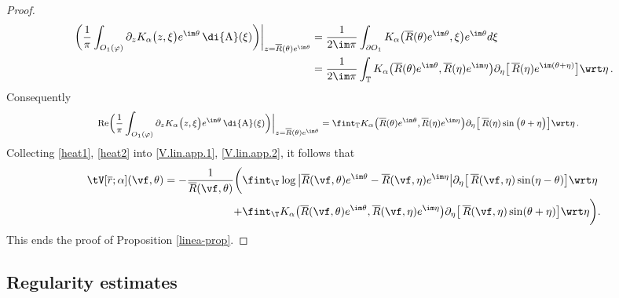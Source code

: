 \documentclass[a4paper,reqno,10pt]{article}
\newcommand{\pa}{\partial}
\newcommand{\wrta}{\,\di {\rm A}}
\begin{document}
\begin{proof}
\begin{align*}
\bigg(\frac{1}{\pi} \int_{O_{1}(\varphi)} \partial_z K_\alpha \big(z, \xi \big) e^{\im \theta}   \wrta(\xi)\bigg)\bigg|_{z=\overline{R}(\theta) e^{\im \theta}}&=\frac{1}{2\im \pi} \int_{\partial O_{1}}  K_\alpha \big(\overline{R}(\theta) e^{\im \theta}, \xi \big) e^{\im \theta}   d\xi  \\
&=\frac{1}{2\im \pi} \int_{\mathbb{T}}  K_\alpha \big(\overline{R}(\theta) e^{\im \theta}, \overline{R}(\eta) e^{\im \eta} \big) \partial_\eta\big[\, \overline{R}(\eta)e^{\im (\theta+\eta)}\big]   \wrt \eta\,.  
\end{align*}
Consequently
\begin{equation}\label{heat2}
    \begin{footnotesize}
        \begin{aligned}
            {\rm Re}\bigg(\frac{1}{\pi} \int_{O_{1}(\varphi)} \partial_z K_\alpha \big(z, \xi \big) e^{\im \theta}   \wrta(\xi)\bigg)\bigg|_{z=\overline{R}(\theta) e^{\im \theta}}&
= \fint_{\mathbb{T}}  K_\alpha \big(\overline{R}(\theta) e^{\im \theta}, \overline{R}(\eta) e^{\im \eta} \big) \partial_\eta\big[\, \overline{R}(\eta)\sin\big(\theta+\eta\big)\big]   \wrt \eta \,. 
        \end{aligned}
    \end{footnotesize}
\end{equation}
Collecting \eqref{heat1}, \eqref{heat2} into \eqref{V.lin.app.1}, \eqref{V.lin.app.2}, it follows that
\begin{align*}
			\nonumber \tV[\overline r;\alpha](\vf,\theta) =  - \frac{1}{ \overline R(\vf,\theta) }\bigg( &\fint_{\T} \log\big|\overline R(\vf,\theta) e^{\im\theta}- \overline R(\vf,\eta)e^{\im\eta} \big| \pa_{\eta} \big[ \,\overline R(\vf,\eta) \sin(\eta-\theta) \big] \wrt\eta \\
			+ & \fint_{\T} K_\alpha\big(\overline R(\vf,\theta)e^{\im\theta}, \overline R(\vf,\eta)e^{\im\eta} \big) \pa_{\eta} \big[ \,\overline R(\vf,\eta) \sin(\theta+\eta) \big] \wrt \eta \bigg).
		\end{align*}
This ends the proof of Proposition \ref{linea-prop}.
 \end{proof}


\subsection{Regularity estimates}
\end{document}
